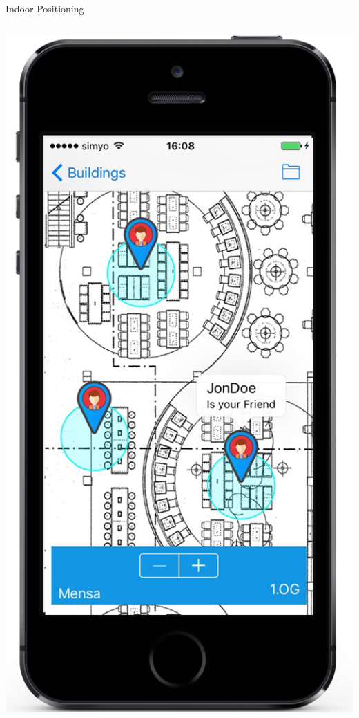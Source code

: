 \documentclass[11pt]{beamer}
\begin{document}
\begin{frame}{Indoor Positioning}
\begin{columns}[T]
    \begin{column}{.4\textwidth}
      \includegraphics[scale=0.25]{mappinpointc}
    \end{column}

  \end{columns}

\end{frame}
\end{document}
